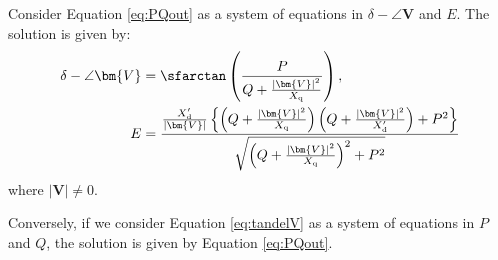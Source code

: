 \documentclass[graybox, envcountchap]{svmult}
\begin{document}
\begin{lemma}\label{lem:delVE}

Consider Equation \ref{eq:PQout} as a system of equations in $\delta - \angle
\bm{V}$ and $E$. The solution is given by:
\begin{subequations}\label{eq:tandelV}
  \begin{align}
    \delta - \angle \bm{V} & = \sfarctan  \left( \frac{P}{Q + \tfrac{ |\bm{V}|^2}{X_{\rm q}} } \right) , \label{eq:tandelVa} \\
    E &= \frac{ \tfrac{X_{\rm d}'}{|\bm{V}| } \left\{ \left( Q + \tfrac{|\bm{V}|^2}{X_{\rm q}} \right) \left(Q + \tfrac{|\bm{V}|^2}{X_{\rm d}'} \right) +P^2  \right\} }{  \sqrt{ \left( Q + \tfrac{|\bm{V}|^2}{X_{\rm q}} \right)^2 + P^2 }  } \label{eq:tandelVb}
  \end{align}
  \end{subequations}
where $|\bm{V}|\neq 0$.

Conversely, if we consider Equation \ref{eq:tandelV} as a system of equations in
$P$ and $Q$, the solution is given by Equation \ref{eq:PQout}.
\end{lemma}
\end{document}
